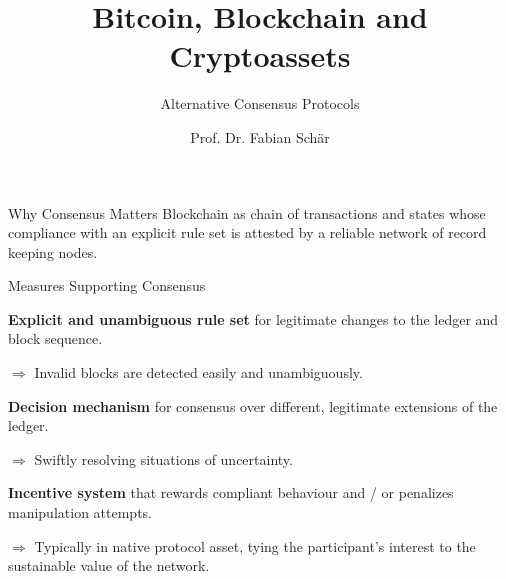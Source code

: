 \documentclass[]{beamer}
\title{Bitcoin, Blockchain and Cryptoassets}
\subtitle{Alternative Consensus Protocols}
\author{Prof. Dr. Fabian Schär}
\institute{University of Basel}
\begin{document}
	
	\thispagestyle{empty}
	\begin{frame}[noframenumbering]
		\titlepage
	\end{frame}
	
	
	\begin{frame}{Why Consensus Matters}
		Blockchain as \color{focus} chain of transactions and states \color{black} whose \color{focus} compliance with an explicit rule set \color{black} is  attested by a reliable network of record keeping nodes.
		
		
	\end{frame}
	
	\begin{frame}{Measures Supporting Consensus}
		
		\textbf{Explicit and unambiguous rule set} for legitimate changes to the ledger and block sequence.
		\vspace{0.25 em}
		
		$\Rightarrow$ Invalid blocks are detected easily and unambiguously.
		\vspace{1.5 em}
		
		\textbf{Decision mechanism} for consensus over different, legitimate extensions of the ledger. 
		\vspace{0.25 em}
		
		$\Rightarrow$ Swiftly resolving situations of uncertainty.
		\vspace{1.5 em}
		
		\textbf{Incentive system} that rewards compliant behaviour and / or penalizes manipulation attempts.
		\vspace{0.25 em}
		
		$\Rightarrow$ Typically in native protocol asset, tying the participant's interest to the sustainable value of the network.
		
	\end{frame}
	
\end{document}

